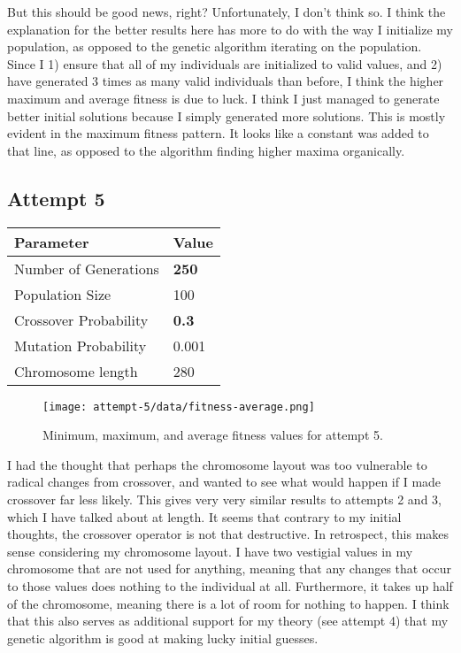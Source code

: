 \documentclass[12pt, letterpaper]{article}
\begin{document}
But this should be good news, right?
Unfortunately, I don't think so.
I think the explanation for the better results here has more to do with the way I initialize my population,
as opposed to the genetic algorithm iterating on the population.
Since I 1) ensure that all of my individuals are initialized to valid values,
and 2) have generated 3 times as many valid individuals than before,
I think the higher maximum and average fitness is due to luck.
I think I just managed to generate better initial solutions because I simply generated more solutions.
This is mostly evident in the maximum fitness pattern.
It looks like a constant was added to that line, as opposed to the algorithm finding higher maxima organically.


\subsection{Attempt 5}
\begin{center}
\begin{tabular}{p{} l}
    \toprule
    \textbf{Parameter}      & \textbf{Value}    \\ \midrule
    Number of Generations   & \textbf{250}      \\
    Population Size         & 100               \\
    Crossover Probability   & \textbf{0.3}      \\
    Mutation Probability    & 0.001             \\ 
    Chromosome length       & 280               \\ \bottomrule
\end{tabular}
\end{center}

\begin{figure}[H]
    \centerline{\texttt{[image: attempt-5/data/fitness-average.png]}}
    \caption{Minimum, maximum, and average fitness values for attempt 5.}\label{Fig:Attempt5Fitness}
\end{figure}

I had the thought that perhaps the chromosome layout was too vulnerable to radical changes from crossover,
and wanted to see what would happen if I made crossover far less likely.
This gives very very similar results to attempts 2 and 3, which I have talked about at length.
It seems that contrary to my initial thoughts, the crossover operator is not that destructive.
In retrospect, this makes sense considering my chromosome layout.
I have two vestigial values in my chromosome that are not used for anything,
meaning that any changes that occur to those values does nothing to the individual at all.
Furthermore, it takes up half of the chromosome, meaning there is a lot of room for nothing to happen.
I think that this also serves as additional support for my theory (see attempt 4) that my genetic algorithm
is good at making lucky initial guesses.
\end{document}
